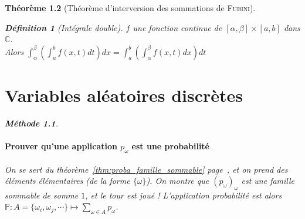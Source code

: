 \documentclass[11pt,a4paper]{report}
\newtheorem{theorem}{Théorème}[chapter]
\theoremstyle{definition}
\newtheorem{dfn}[theorem]{Définition}
\newtheorem{methode}[theorem]{Méthode}
\begin{document}
\begin{theorem}[Théorème d'interversion des sommations de \textsc{Fubini}]
{{%
\begin{dfn}[Intégrale double]
$f$ une fonction continue de $[\alpha{},\beta{}]\times [a,b]$ dans $\ensuremath{\mathbb{C}}$. \\
Alors $\displaystyle\int_{\alpha}^{\beta}\left(\displaystyle\int_{a}^{b}f(x,t)dt\right)dx=\displaystyle\int_{a}^{b}\left(\displaystyle\int_{\alpha}^{\beta}f(x,t)dx\right)dt$
\end{dfn}

\chapter{Variables aléatoires discrètes} %
\label{cha:variables_aleatoires_discretes}
\begin{methode}
     \subsubsection*{Prouver qu'une application $p_\omega$ est une probabilité}
     On se sert du théorème~\ref{thm:proba_famille_sommable} page~\pageref{thm:proba_famille_sommable}, et on prend des éléments élémentaires (de la forme $\lbrace \omega \rbrace$). On montre que $(p_\omega )_{\omega}$ est une famille sommable de somme $1$, et le tour est joué ! L'application probabilité est alors $\mathbb{P} : A= \lbrace \omega_i, \omega_j, \cdots  \rbrace \longmapsto \sum_{\omega\in A} p_\omega$.
\end{methode}
}}
\end{theorem}
\end{document}
